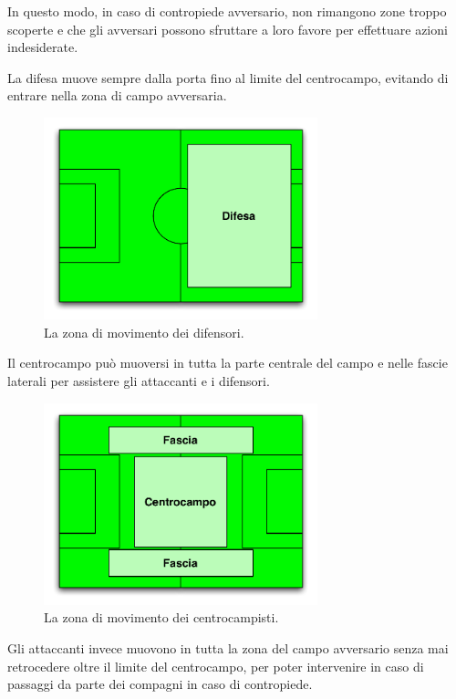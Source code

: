 \documentclass[aps,letterpaper,10pt]{article}
\begin{document}
In questo modo, in caso di contropiede avversario, non rimangono zone troppo scoperte e che gli avversari possono sfruttare a loro favore per effettuare azioni indesiderate.

La difesa muove sempre dalla porta fino al limite del centrocampo, evitando di entrare nella zona di campo avversaria.

\begin{figure}[H]
	\begin{center}
		\includegraphics[width=300px]{images/defense.pdf}
	\end{center}
\caption{La zona di movimento dei difensori.}
\end{figure}

Il centrocampo pu\`o muoversi in tutta la parte centrale del campo e nelle fascie laterali per assistere gli attaccanti e i difensori.

\begin{figure}[H]
	\begin{center}
		\includegraphics[width=300px]{images/middle.pdf}
	\end{center}
\caption{La zona di movimento dei centrocampisti.}
\end{figure}

Gli attaccanti invece muovono in tutta la zona del campo avversario senza mai retrocedere oltre il limite del centrocampo, per poter intervenire in caso di passaggi da parte dei compagni in caso di contropiede.
\end{document}
